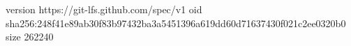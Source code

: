 version https://git-lfs.github.com/spec/v1
oid sha256:248f41e89ab30f83b97432ba3a5451396a619dd60d71637430f021c2ee0320b0
size 262240
